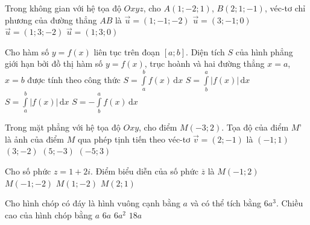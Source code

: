 \begin{ex}%
Trong không gian với hệ tọa độ $Oxyz$, cho $A(1;-2;1)$, $B(2;1;-1)$, véc-tơ chỉ phương của đường thẳng $AB$ là
\choice
{$\overrightarrow{u}=(1;-1;-2)$}
{$\overrightarrow{u}=(3;-1;0)$}
{\True $\overrightarrow{u}=(1;3;-2)$}
{$\overrightarrow{u}=(1;3;0)$}
\end{ex}
\begin{ex}%
Cho hàm số $y=f(x)$ liên tục trên đoạn $[ a;b]$. Diện tích $S$ của hình phẳng giới hạn bởi đồ thị hàm số $y=f(x)$, trục hoành và hai đường thẳng $x=a$, $x=b$ được tính theo công thức
\choice
{$S=\displaystyle\int\limits_ a^ b f(x)\mathrm{\,d}x$}
{$S=\displaystyle\int\limits_ b^ a |f(x)|\mathrm{\,d}x$}
{\True $S=\displaystyle\int\limits_ a^ b |f(x)|\mathrm{\,d}x$}
{$S=-\displaystyle\int\limits_ b^a f(x)\mathrm{\,d}x$}
\end{ex}
\begin{ex}%
Trong mặt phẳng với hệ tọa độ $Oxy$, cho điểm $M(-3;2)$. Tọa độ của điểm $M’$ là ảnh của điểm $M$ qua phép tịnh tiến theo véc-tơ $\overrightarrow{v}=(2;-1)$ là
\choice
{\True $(-1;1)$}
{$(3;-2)$}
{$(5;-3)$}
{$(-5;3)$}
\end{ex}
\begin{ex}%
Cho số phức $z=1+2i$. Điểm biểu diễn của số phức $\overline{z}$ là
\choice
{$M(-1;2)$}
{$M(-1;-2)$}
{\True $M(1;-2)$}
{$M(2;1)$}
\end{ex}
\begin{ex}%
Cho hình chóp có đáy là hình vuông cạnh bằng $a$ và có thể tích bằng $6a^3$. Chiều cao của hình chóp bằng
\choice
{$a$}
{$6a$}
{$6a^2$}
{\True $18a$}
\end{ex}
